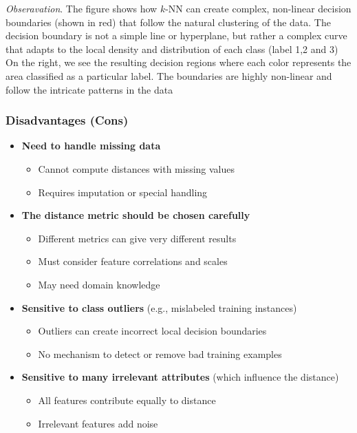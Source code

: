 \documentclass[a4paper]{article}
\theoremstyle{definition}
\begin{document}
\textit{Obseravation}. The figure shows how \( k \)-NN can create complex, non-linear decision boundaries 
(shown in red) that follow the natural clustering of the data. The decision boundary is not a simple line or hyperplane, but rather a complex 
curve that adapts to the local density and distribution of each class (label 1,2 and 3)
\vspace{1em}
\noindent
\newline
On the right, we see the resulting decision regions where each color represents the area classified as a particular label.
The boundaries are highly non-linear and follow the intricate patterns in the data
\subsubsection{Disadvantages (Cons)}
\begin{itemize}
    \item \textbf{Need to handle missing data}
    \begin{itemize}
        \item Cannot compute distances with missing values 
        \item Requires imputation or special handling
    \end{itemize}
    \item \textbf{The distance metric should be chosen carefully}
    \begin{itemize}
        \item Different metrics can give very different results 
        \item Must consider feature correlations and scales 
        \item May need domain knowledge
    \end{itemize}
    \item \textbf{Sensitive to class outliers} (e.g., mislabeled training instances)
    \begin{itemize}
        \item Outliers can create incorrect local decision boundaries
        \item No mechanism to detect or remove bad training examples 
    \end{itemize}
    \item \textbf{Sensitive to many irrelevant attributes} (which influence the distance)
    \begin{itemize}
        \item All features contribute equally to distance
        \item Irrelevant features add noise 

\end{itemize}
\end{itemize}
\end{document}
